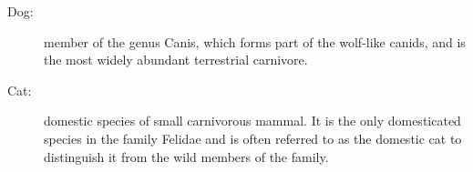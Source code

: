 \documentclass{article}
\begin{document}
	\begin{description}
		\item[Dog:] member of the genus Canis, which forms part of the wolf-like canids, and is the most widely abundant terrestrial carnivore.
		\item[Cat:] domestic species of small carnivorous mammal. It is the only domesticated species in the family Felidae and is often referred to as the domestic cat to distinguish it from the wild members of the family.
	\end{description}
\end{document}

